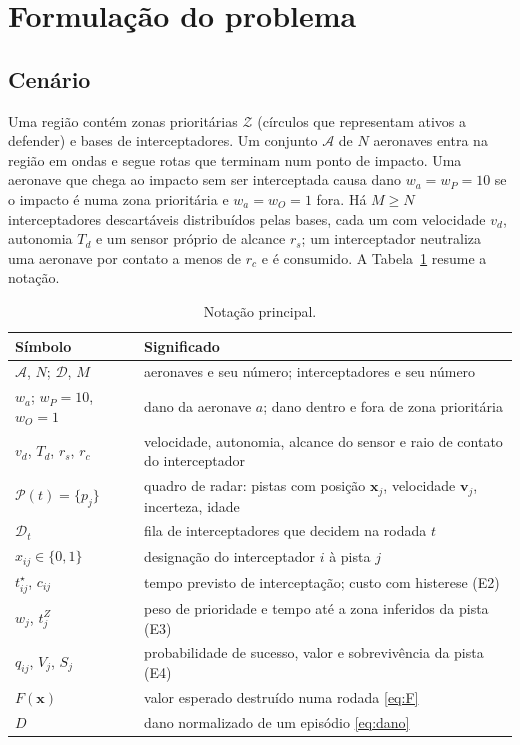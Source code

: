 \documentclass[11pt,a4paper]{article}
\begin{document}
\section{Formulação do problema}\label{sec:problema}

\subsection{Cenário}
Uma região contém zonas prioritárias $\mathcal{Z}$ (círculos que representam ativos a defender) e bases de
interceptadores. Um conjunto $\mathcal{A}$ de $N$ aeronaves entra na região em ondas e segue rotas que terminam num
ponto de impacto. Uma aeronave que chega ao impacto sem ser interceptada causa dano $w_a=w_P=10$ se o impacto é numa zona
prioritária e $w_a=w_O=1$ fora. Há $M\ge N$ interceptadores descartáveis distribuídos pelas bases, cada um com
velocidade $v_d$, autonomia $T_d$ e um sensor próprio de alcance $r_s$; um interceptador neutraliza uma aeronave por
contato a menos de $r_c$ e é consumido. A Tabela~\ref{tab:notacao} resume a notação.

\begin{table}[t]
\centering
\caption{Notação principal.}
\label{tab:notacao}
\small
\begin{tabularx}{\textwidth}{@{}lX@{}}
\toprule
Símbolo & Significado \\
\midrule
$\mathcal{A}$, $N$; $\mathcal{D}$, $M$ & aeronaves e seu número; interceptadores e seu número \\
$w_a$; $w_P=10$, $w_O=1$ & dano da aeronave $a$; dano dentro e fora de zona prioritária \\
$v_d$, $T_d$, $r_s$, $r_c$ & velocidade, autonomia, alcance do sensor e raio de contato do interceptador \\
$\mathcal{P}(t)=\{p_j\}$ & quadro de radar: pistas com posição $\bm{x}_j$, velocidade $\bm{v}_j$, incerteza, idade \\
$\mathcal{D}_t$ & fila de interceptadores que decidem na rodada $t$ \\
$x_{ij}\in\{0,1\}$ & designação do interceptador $i$ à pista $j$ \\
$t^\star_{ij}$, $c_{ij}$ & tempo previsto de interceptação; custo com histerese (E2) \\
$w_j$, $t^Z_j$ & peso de prioridade e tempo até a zona inferidos da pista (E3) \\
$q_{ij}$, $V_j$, $S_j$ & probabilidade de sucesso, valor e sobrevivência da pista (E4) \\
$F(\bm{x})$ & valor esperado destruído numa rodada \eqref{eq:F} \\
$D$ & dano normalizado de um episódio \eqref{eq:dano} \\
\bottomrule
\end{tabularx}
\end{table}
\end{document}
